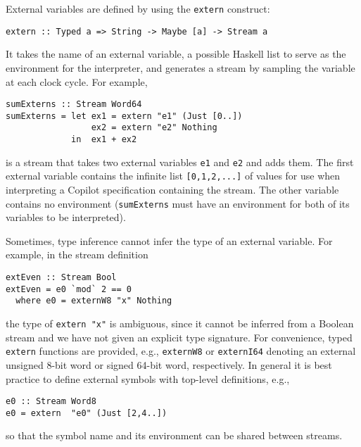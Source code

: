 External variables are defined by using the {\tt extern} construct:
%
\begin{lstlisting}
extern :: Typed a => String -> Maybe [a] -> Stream a
\end{lstlisting}
%
\noindent
It takes the name of an external variable, a possible Haskell list to serve as
the environment for the interpreter, and generates a stream by sampling the
variable at each clock cycle.  For example,
%
\begin{lstlisting}[frame=single]
sumExterns :: Stream Word64
sumExterns = let ex1 = extern "e1" (Just [0..])
                 ex2 = extern "e2" Nothing
             in  ex1 + ex2
\end{lstlisting}
%
is a stream that takes two external variables {\tt e1} and {\tt e2} and adds
them.  The first external variable contains the infinite list {\tt [0,1,2,...]}
of values for use when interpreting a Copilot specification containing the
stream.  The other variable contains no environment ({\tt sumExterns} must have
an environment for both of its variables to be interpreted).

Sometimes, type inference cannot infer the type of an external variable.  For
example, in the stream definition
%
\begin{lstlisting}[frame=single]
extEven :: Stream Bool
extEven = e0 `mod` 2 == 0
  where e0 = externW8 "x" Nothing 
\end{lstlisting}
%
\noindent
the type of {\tt extern "x"} is ambiguous, since it cannot be inferred from a
Boolean stream and we have not given an explicit type signature.  For
convenience, typed {\tt extern} functions are provided, e.g., {\tt externW8} or
{\tt externI64} denoting an external unsigned 8-bit word or signed 64-bit word,
respectively.  In general it is best practice to define external symbols with
top-level definitions, e.g.,
%
\begin{lstlisting}[frame=single]
e0 :: Stream Word8
e0 = extern  "e0" (Just [2,4..])
\end{lstlisting}

\noindent
so that the symbol name and its environment can be shared between streams.

